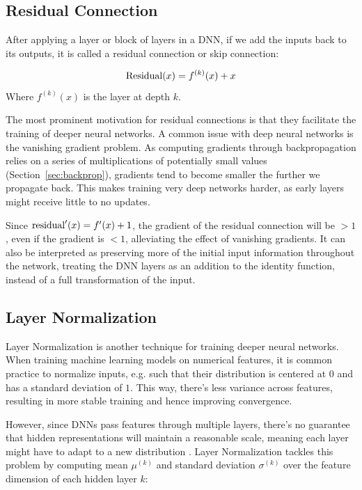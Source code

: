 \subsection{Residual Connection}
After applying a layer or block of layers in a DNN, if we add the inputs back to its outputs, it is called a residual connection or skip connection:

\begin{equation}
    \text{Residual}(x) = f^{(k)}(x) + x
\end{equation}
Where $f^{(k)}(x)$ is the layer at depth $k$.

The most prominent motivation for residual connections is that they facilitate the training of deeper neural networks. A common issue with deep neural networks is the vanishing gradient problem. As computing gradients through backpropagation relies on a series of multiplications of potentially small values (Section~\ref{sec:backprop}), gradients tend to become smaller the further we propagate back. This makes training very deep networks harder, as early layers might receive little to no updates.

Since $\text{residual}'(x) = f'(x) + 1$, the gradient of the residual connection will be $>1$, even if the gradient is $<1$, alleviating the effect of vanishing gradients. It can also be interpreted as preserving more of the initial input information throughout the network, treating the DNN layers as an addition to the identity function, instead of a full transformation of the input.

\subsection{Layer Normalization}
Layer Normalization \cite{ba2016layer} is another technique for training deeper neural networks. When training machine learning models on numerical features, it is common practice to normalize inputs, e.g. such that their distribution is centered at $0$ and has a standard deviation of $1$. This way, there's less variance across features, resulting in more stable training and hence improving convergence.

However, since DNNs pass features through multiple layers, there's no guarantee that hidden representations will maintain a reasonable scale, meaning each layer might have to adapt to a new distribution \cite{DBLP:journals/corr/IoffeS15}. Layer Normalization tackles this problem by computing mean $\mu^{(k)}$ and standard deviation $\sigma^{(k)}$ over the feature dimension of each hidden layer $k$:

